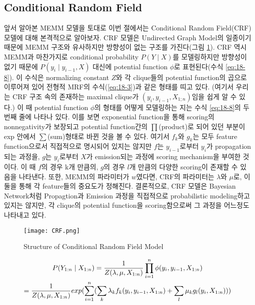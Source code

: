 \documentclass[draft=false]{oblivoir}
\begin{document}
\subsection{Conditional Random Field}
앞서 알아본 MEMM 모델을 토대로 이번 절에서는 Conditional Random Field(CRF) 모델에 대해 본격적으로 알아보자. CRF 모델은 Undirected Graph Model의 일종이기 때문에 MEMM 구조와 유사하지만 방향성이 없는 구조를 가진다(그림 \ref{fig:18-8}).  CRF 역시 MEMM과 마찬가지로 conditional probability $P(Y\mid X)$를 모델링하지만 방향성이 없기 때문에 $P(y_i\mid y_{i-1},X)$ 대신에 potential function $\phi$로 표현된다(수식 \ref{eq:18-8}). 이 수식은 normalizing constant $Z$와 각 clique들의 potential function의 곱으로 이루어져 있어 전형적 MRF의 수식(\ref{eq:18-3})과 같은 형태를 띠고 있다. (여기서 우리는 CRF 구조 속의 존재하는 maximal clique가 $(y_i,y_{i-1},X_{1;n})$임을 쉽게 알 수 있다.) 이 때 potential function $\phi$의 형태를 어떻게 모델링하는 지는 수식 \ref{eq:18-8}의 두번째 줄에 나타나 있다. 이를 보면 exponential function을 통해 scoring의  nonnegativity가 보장되고 potential function간의 $\prod$(product)로 되어 있던 부분이 exp 안에서 $\sum$(sum)형태로 바뀐 것을 볼 수 있다. 여기서 $f_k$와 $g_k$는 모두 feature function으로서 직접적으로 명시되어 있지는 않지만 $f$는 $y_{i-1}$로부터 $y_i$가 propagation되는 과정을, $g$는 $y_i$로부터 $X$가 emission되는 과정에 scoring mechanism을 부여한 것이다. 이 때 $f$의 경우 k개 만큼의, $g$의 경우 $l$개 만큼의 다양한 scoring이 존재할 수 있음을 나타낸다. 또한, MEMM의 파라미터가 $w$였다면, CRF의 파라미터는 $\lambda$와 $\mu$로, 이 둘을 통해 각 feature들의 중요도가 정해진다. 결론적으로, CRF 모델은 Bayesian Network처럼 Propagtion과 Emission 과정을 직접적으로 probabilistic modeling하고 있지는 않지만, 각 clique의 potential function을 scoring함으로써 그 과정을 어느정도 나타내고 있다.

\begin{figure}[ht] \centering 
  \texttt{[image: CRF.png]}
  \caption{Structure of Conditional Random Field Model}
  \label{fig:18-8}
\end{figure}

\begin{gather}
	P(Y_{1:n}\mid X_{1:n}) = {1 \over Z(\lambda,\mu,X_{1:n})} \prod_{i=1}^{n}{\phi(y_i,y_{i-1},X_{1:n})}\nonumber\\
	={1 \over Z(\lambda,\mu,X_{1:n})}exp(\sum_{i=1}^{n}(\sum_k\lambda_k f_k(y_i,y_{i-1},X_{1:n})+\sum_l{\mu_k g_l(y_i,X_{1:n})}))
\label{eq:18-8}
\end{gather}
\end{document}
